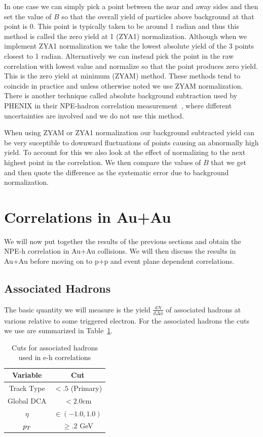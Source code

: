 In one case we can simply pick a point between the near and away sides and then set the value of $B$ so that the overall yield of particles above background at that point is 0. This point is typically taken to be around 1 radian and thus this method is called the zero yield at 1 (ZYA1) normalization. Although when we implement ZYA1 normalization we take the lowest absolute yield of the 3 points closest to 1 radian. Alternatively we can instead pick the point in the raw correlation with lowest value and normalize so that the point produces zero yield. This is the zero yield at minimum (ZYAM) method. These methods tend to coincide in practice and unless otherwise noted we use ZYAM normalization. There is another technique called absolute background subtraction used by PHENIX in their NPE-hadron correlation measurement~\cite{PHENIXeh}, where different uncertainties are involved and we do not use this method. 

When using ZYAM or ZYA1 normalization our background subtracted yield can be very suceptible to downward fluctuations of points causing an abnormally high yield. To account for this we also look at the effect of normalizing to the next highest point in the correlation. We then compare the values of $B$ that we get and then quote the difference as the systematic error due to background normalization.

\section{Correlations in Au+Au}

We will now put together the results of the previous sections and obtain the NPE-h correlation in Au+Au collisions. We will then discuss the results in Au+Au before moving on to p+p and event plane dependent correlations.

\subsection{Associated Hadrons}

The basic quantity we will measure is the yield $\frac{dN}{d\Delta\phi}$ of associated hadrons at various relative to some triggered electron. For the associated hadrons the cuts we use are summarized in Table~\ref{tab:assohcuts}.

\begin{table}
\centering
\begin{tabular}{|c|c|}
\hline
Variable			& Cut \\
\hline
Track Type          & $< .5$ (Primary) \\
\hline
Global DCA          & $< 2.0$cm \\
\hline
$\eta$              & $\in(-1.0, 1.0)$ \\
\hline
$p_{T}$               & $\geq .2$ GeV \\
\hline
\end{tabular}
\caption[Associated hadron cuts]{Cuts for associated hadrons used in e-h correlations}
\label{tab:assohcuts}
\end{table} 

